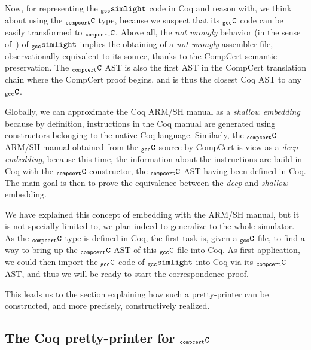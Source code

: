 \documentclass[a4paper, 11pt]{article}
\newcommand{\gccSL}{$_{\tt gcc}{\tt simlight}$\xspace}
\newcommand{\C}{$_{\tt compcert}{\tt C}$\xspace}
\newcommand{\gccC}{$_{\tt gcc}{\tt C}$\xspace}
\begin{document}
Now, for representing the \gccSL code in Coq and reason with, we think about using the \C type, because we suspect that its \gccC code can be easily transformed to \C. Above all, the \emph{not wrongly} behavior (in the sense of~\cite{Leroy-Compcert-CACM}) of \gccSL implies the obtaining of a \emph{not wrongly} assembler file, observationally equivalent to its source, thanks to the CompCert semantic preservation. The \C AST is also the first AST in the CompCert translation chain where the CompCert proof begins, and is thus the closest Coq AST to any \gccC.

\hspace{1ex}

Globally, we can approximate the Coq ARM/SH manual as a \emph{shallow embedding} because by definition, instructions in the Coq manual are generated using constructors belonging to the native Coq language. Similarly, the \C ARM/SH manual obtained from the \gccC source by CompCert is view as a \emph{deep embedding}, because this time, the information about the instructions are build in Coq with the \C constructor, the \C AST having been defined in Coq. The main goal is then to prove the equivalence between the \emph{deep} and \emph{shallow} embedding.

We have explained this concept of embedding with the ARM/SH manual, but it is not specially limited to, we plan indeed to generalize to the whole simulator. As the \C type is defined in Coq, the first task is, given a \gccC file, to find a way to bring up the \C AST of this \gccC file into Coq. As first application, we could then import the \gccC code of \gccSL into Coq via its \C AST, and thus we will be ready to start the correspondence proof.

\hspace{1ex}

This leads us to the section explaining how such a pretty-printer can be constructed, and more precisely, constructively realized.


\subsection{The Coq pretty-printer for \C}
\end{document}
